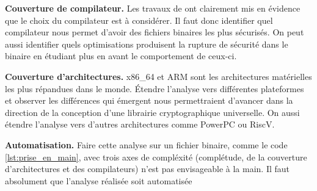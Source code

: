 \textbf{Couverture de compilateur.} Les travaux de \citeauthor{schneider2024breakingbadcompilersbreak} \cite{schneider2024breakingbadcompilersbreak} ont clairement mis en évidence que le choix du compilateur est à considérer. Il faut donc identifier quel compilateur nous permet d'avoir des fichiers binaires les plus sécurisés. On peut aussi identifier quels optimisations produisent la rupture de sécurité dans le binaire en étudiant plus en avant le comportement de ceux-ci.

\textbf{Couverture d'architectures.} x86\_64 et ARM sont les architectures matérielles les plus répandues dans le monde. Étendre l'analyse vers différentes plateformes et observer les différences qui émergent nous permettraient d'avancer dans la direction de la conception d'une librairie cryptographique universelle. On aussi étendre l'analyse vers d'autres architectures comme PowerPC ou RiscV.\medbreak


\textbf{Automatisation.} Faire cette analyse sur un fichier binaire, comme le code \ref{lst:prise_en_main}, avec trois axes de compléxité (complétude, de la couverture d'architectures et des compilateurs) n'est pas envisageable à la main. Il faut absolument que l'analyse réalisée soit automatisée





